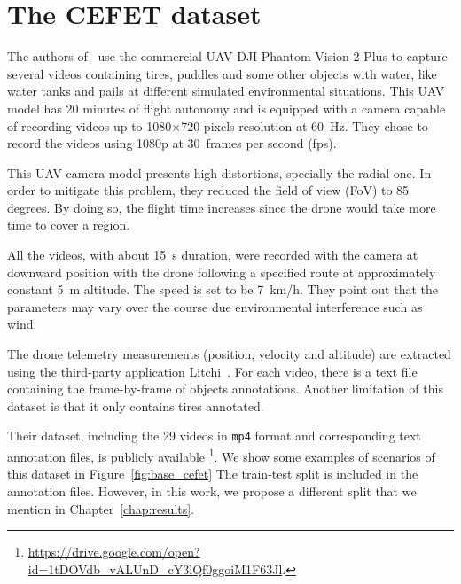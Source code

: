
\section{The CEFET dataset}\label{sec:cefet_data}
%
The authors of~\cite{casfinal2018} use the commercial UAV DJI Phantom Vision 2 Plus to capture several videos containing tires, puddles and some other objects with water, like water tanks and pails at different simulated environmental situations.
This UAV model has 20 minutes of flight autonomy and is equipped with a camera capable of recording videos up to 1080$\times$720 pixels resolution at 60~Hz.
They chose to record the videos using 1080p at 30~frames per second (fps).

This UAV camera model presents high distortions, specially the radial one.
In order to mitigate this problem, they reduced the field of view (FoV) to 85 degrees.
By doing so, the flight time increases since the drone would take more time to cover a region.

All the videos, with about 15~s duration, were recorded with the camera at downward position with the drone following a specified route at
approximately constant 5~m altitude.
The speed is set to be 7~km/h.
They point out that the parameters may vary over the course due environmental interference such as wind.

The drone telemetry measurements (\eg position, velocity and altitude) are extracted using the third-party application Litchi~\cite{web:litchi}.
For each video, there is a text file containing the frame-by-frame of objects annotations.
Another limitation of this dataset is that it only contains tires annotated.

Their dataset, including the 29 videos in \verb|mp4| format and corresponding text annotation files, is publicly available
\footnote{\url{https://drive.google.com/open?id=1tDOVdb_vALUnD_cY3lQf0ggoiM1F63Jl}.}.
We show some examples of scenarios of this dataset in Figure~\ref{fig:base_cefet}
The train-test split is included in the annotation files.
However, in this work, we propose a different split that we mention in Chapter~\ref{chap:results}.

